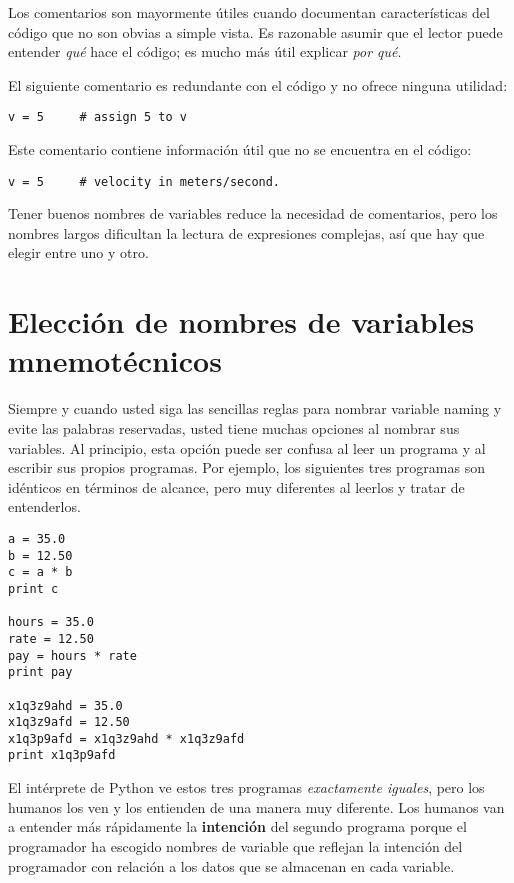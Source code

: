 \begin{ex}
Los comentarios son mayormente \'utiles cuando documentan caracter\'isticas del c\'odigo que no son obvias a simple vista.  Es razonable asumir que el lector puede entender
\emph{qu\'e} hace el c\'odigo; es mucho m\'as \'util explicar \emph{por qu\'e}.

El siguiente comentario es redundante con el c\'odigo  y no ofrece ninguna utilidad:

\beforeverb
\begin{verbatim}
v = 5     # assign 5 to v
\end{verbatim}
\afterverb
%
Este comentario contiene informaci\'on \'util que no se encuentra en el c\'odigo:

\beforeverb
\begin{verbatim}
v = 5     # velocity in meters/second. 
\end{verbatim}
\afterverb
%
Tener buenos nombres de variables reduce la necesidad de comentarios, pero
los nombres largos dificultan la lectura de expresiones complejas, as\'i que hay que elegir entre uno y otro.

\section{Elecci\'on de nombres de variables mnemot\'ecnicos}


Siempre y cuando usted siga las sencillas reglas para nombrar variable naming y evite las palabras reservadas, usted tiene muchas opciones al nombrar sus variables.
Al principio, esta opci\'on puede ser confusa al leer un  
programa y al escribir sus propios programas. Por ejemplo, los siguientes tres programas son id\'enticos en t\'erminos de alcance,
pero muy diferentes al leerlos y tratar de entenderlos.

\beforeverb
\begin{verbatim}
a = 35.0
b = 12.50
c = a * b
print c

hours = 35.0
rate = 12.50
pay = hours * rate
print pay

x1q3z9ahd = 35.0
x1q3z9afd = 12.50
x1q3p9afd = x1q3z9ahd * x1q3z9afd
print x1q3p9afd
\end{verbatim}
\afterverb
%
El int\'erprete de Python ve estos tres programas \emph{exactamente iguales}, pero los humanos los ven y los entienden de una manera muy diferente.  
Los humanos van a entender m\'as r\'apidamente la {\bf intenci\'on} 
del segundo programa porque el  
programador ha escogido nombres de variable que reflejan la intenci\'on del programador
con relaci\'on a los datos que se almacenan en cada variable.


\end{ex}
